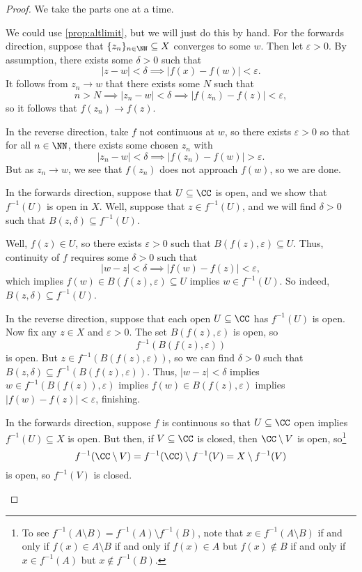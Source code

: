 \documentclass[../notes.tex]{subfiles}
\begin{document}
\begin{proof}
	We take the parts one at a time.
	\begin{listalph}
		\item We could use \autoref{prop:altlimit}, but we will just do this by hand. For the forwards direction, suppose that $\{z_n\}_{n\in\NN}\subseteq X$ converges to some $w$. Then let $\varepsilon>0$. By assumption, there exists some $\delta>0$ such that
		\[|z-w|<\delta\implies|f(x)-f(w)|<\varepsilon.\]
		It follows from $z_n\to w$ that there exists some $N$ such that
		\[n>N\implies|z_n-w|<\delta\implies|f(z_n)-f(z)|<\varepsilon,\]
		so it follows that $f(z_n)\to f(z)$.
		
		In the reverse direction, take $f$ not continuous at $w$, so there exists $\varepsilon>0$ so that for all $n\in\NN$, there exists some chosen $z_n$ with
		\[|z_n-w|<\delta\implies|f(z_n)-f(w)|>\varepsilon.\]
		But as $z_n\to w$, we see that $f(z_n)$ does not approach $f(w)$, so we are done.

		\item In the forwards direction, suppose that $U\subseteq\CC$ is open, and we show that $f^{-1}(U)$ is open in $X$. Well, suppose that $z\in f^{-1}(U)$, and we will find $\delta>0$ such that $B(z,\delta)\subseteq f^{-1}(U)$. 
		
		Well, $f(z)\in U$, so there exists $\varepsilon>0$ such that $B(f(z),\varepsilon)\subseteq U$. Thus, continuity of $f$ requires some $\delta>0$ such that
		\[|w-z|<\delta\implies|f(w)-f(z)|<\varepsilon,\]
		which implies $f(w)\in B(f(z),\varepsilon)\subseteq U$ implies $w\in f^{-1}(U)$. So indeed, $B(z,\delta)\subseteq f^{-1}(U)$.

		In the reverse direction, suppose that each open $U\subseteq\CC$ has $f^{-1}(U)$ is open. Now fix any $z\in X$ and $\varepsilon>0$. The set $B(f(z),\varepsilon)$ is open, so
		\[f^{-1}(B(f(z),\varepsilon))\]
		is open. But $z\in f^{-1}(B(f(z),\varepsilon))$, so we can find $\delta>0$ such that $B(z,\delta)\subseteq f^{-1}(B(f(z),\varepsilon))$. Thus, $|w-z|<\delta$ implies $w\in f^{-1}(B(f(z)),\varepsilon)$ implies $f(w)\in B(f(z),\varepsilon)$ implies $|f(w)-f(z)|<\varepsilon$, finishing.

		\item In the forwards direction, suppose $f$ is continuous so that $U\subseteq\CC$ open implies $f^{-1}(U)\subseteq X$ is open. But then, if $V\subseteq\CC$ is closed, then $\CC\setminus V$ is open, so\footnote{To see $f^{-1}(A\setminus B)=f^{-1}(A)\setminus f^{-1}(B)$, note that $x\in f^{-1}(A\setminus B)$ if and only if $f(x)\in A\setminus B$ if and only if $f(x)\in A$ but $f(x)\notin B$ if and only if $x\in f^{-1}(A)$ but $x\notin f^{-1}(B)$.}
		\[f^{-1}(\CC\setminus V)=f^{-1}(\CC)\setminus f^{-1}(V)=X\setminus f^{-1}(V)\]
		is open, so $f^{-1}(V)$ is closed.


\end{listalph}
\end{proof}
\end{document}
